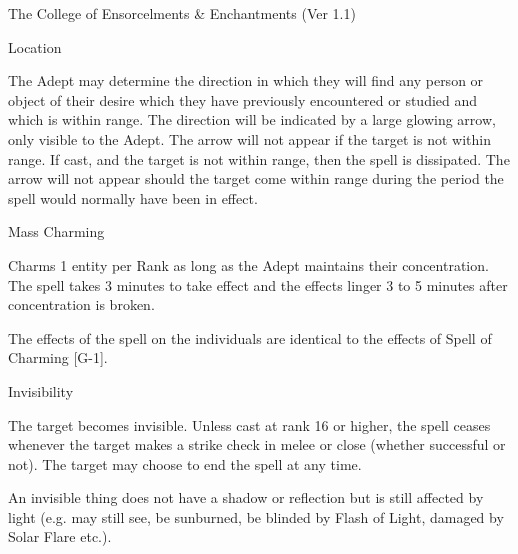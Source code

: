 \begin{Chapter}{The College of Ensorcelments \& Enchantments (Ver 1.1)}
\begin{spell}[G-6]{Location }

\begin{effects}
The Adept may determine the direction in which they will find any
person or object of their desire which they have previously
encountered or studied and which is within range.  The direction will
be indicated by a large glowing arrow, only visible to the Adept.  The
arrow will not appear if the target is not within range. If cast, and
the target is not within range, then the spell is dissipated. The
arrow will not appear should the target come within range during the
period the spell would normally have been in effect.
\end{effects}
\end{spell}

\begin{spell}[G-7]{Mass Charming }

\begin{effects}
Charms 1 entity per Rank as long as the Adept maintains their
concentration.  The spell takes 3 minutes to take effect and the
effects linger 3 to 5 minutes after concentration is broken.

The effects of the spell on the individuals are identical to the
effects of Spell of Charming [G-1].
\end{effects}
\end{spell}

\begin{spell}[G-8]{Invisibility}
\begin{effects}
The target becomes invisible.  Unless cast at rank 16 or higher, the
spell ceases whenever the target makes a strike check in melee or
close (whether successful or not). The target may choose to end the
spell at any time.

An invisible thing does not have a shadow or reflection but is still
affected by light (e.g.  may still see, be sunburned, be blinded by
Flash of Light, damaged by Solar Flare etc.).


\end{effects}
\end{spell}
\end{Chapter}
